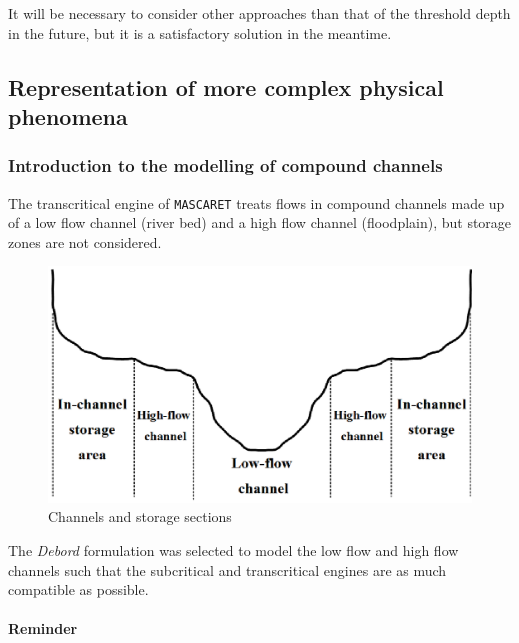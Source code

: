 \vspace{0.5cm}

It will be necessary to consider other approaches than that of the threshold depth in the future, but it is a satisfactory solution in the meantime.

\subsection{Representation of more complex physical phenomena}

\label{ModelCplx}

\subsubsection{Introduction to the modelling of compound channels}

The transcritical engine of \texttt{MASCARET} treats flows in compound channels made up of a low flow channel (river bed) and a high flow channel (floodplain), but storage zones are not considered.

\begin{figure}[h]
 \begin{center}
  \includegraphics[scale=0.8]{Figures/Lits.eps}
  \caption{Channels and storage sections}
 \end{center}
\end{figure}

The \emph{Debord} formulation was selected to model the low flow and high flow channels such that the subcritical and transcritical engines are as much compatible as possible.

\paragraph{Reminder\\}

